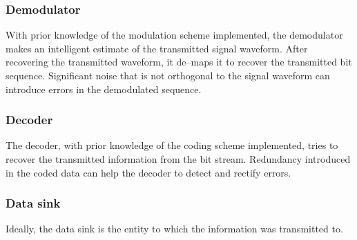 \subsubsection{Demodulator}
\label{subsubsec:outlineDemodulator}
With prior knowledge of the modulation scheme implemented, the demodulator makes an intelligent estimate of the transmitted signal waveform. After recovering the transmitted waveform, it de--maps it to recover the transmitted bit sequence. Significant noise that is not orthogonal to the signal waveform can introduce errors in the demodulated sequence.

\subsubsection{Decoder}
\label{subsubsec:outlineDecoder}
The decoder, with prior knowledge of the coding scheme implemented, tries to recover the transmitted information from the bit stream. Redundancy introduced in the coded data can help the decoder to detect and rectify errors.

\subsubsection{Data sink}
\label{subsubsec:outlineSink}
Ideally, the data sink is the entity to which the information was transmitted to. 
